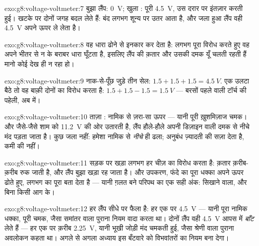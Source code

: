 \begin{solution}{exo:g8:voltage-voltmeter:7}
बुझा लैंप: \qty{0}{V}; खुला : पूरी \qty{4.5}{V}, उस दरार पर
इंतज़ार करती हुई। खटके पर दोनों जगह बदल लेते हैं: बंद  लगभग शून्य
पर उतर आता है, और जला हुआ लैंप वही \qty{4.5}{V} अपने ऊपर ले लेता है।
\end{solution}

\begin{solution}{exo:g8:voltage-voltmeter:8}
वह धारा ढोने से इनकार कर देता है: लगभग पूरा विरोध करते हुए वह अपने
भीतर से न के बराबर धारा घूँटता है, इसलिए लैंप की क़तार और उसकी दमक
यूँ चलती रहती हैं मानो कोई देख ही न रहा हो।
\end{solution}

\begin{solution}{exo:g8:voltage-voltmeter:9}
नाक-से-पूँछ जुड़े तीन सेल: $1.5 + 1.5 + 1.5 = \qty{4.5}{V}$. एक उलटा
बैठे तो वह बाक़ी दोनों का विरोध करता है: $1.5 + 1.5 - 1.5 =
\qty{1.5}{V}$ --- बरसों पहले वाली टॉर्च की पहेली, अब  में।
\end{solution}

\begin{solution}{exo:g8:voltage-voltmeter:10}
ताज़ा : नामिक से ज़रा-सा ऊपर --- यानी पूरी ख़ुशमिज़ाज चमक। और
जैसे-जैसे शाम  को \qty{11.2}{V} की ओर उतारती है, लैंप हौले-हौले
अपनी डिज़ाइन वाली दमक से नीचे मंद पड़ता जाता है। कुछ जला नहीं:
 हमेशा नामिक से \emph{नीचे} ही ढला; अनुबंध ज़्यादती की सज़ा
देता है, कमी की नहीं।
\end{solution}

\begin{solution}{exo:g8:voltage-voltmeter:11}
सड़क पर खड़ा  लगभग हर चीज़ का विरोध करता है: क़तार क़रीब-क़रीब
रुक जाती है, और लैंप बुझा खड़ा रह जाता है। और उपकरण, फंदे का पूरा
धक्का अपने ऊपर ढोते हुए, लगभग  का पूरा  बता देता है ---
यानी ग़लत बने परिपथ का एक सही अंक: सिखाने वाला, और बिना किसी आग के।
\end{solution}

\begin{solution}{exo:g8:voltage-voltmeter:12}
 हर लैंप सीधे  पर फैला है: हर एक पर \qty{4.5}{V} ---
यानी पूरा नामिक धक्का, पूरी चमक, जैसा समांतर वाला पुराना नियम वादा
करता था।  दोनों लैंप वही \qty{4.5}{V} आपस में \emph{बाँट}
लेते हैं --- हर एक पर क़रीब \qty{2.25}{V}, यानी भूखी जोड़ी मंद चमकती
हुई, जैसा श्रेणी वाला पुराना अवलोकन कहता था। अगले से अगला अध्याय इस
बँटवारे को विभवांतरों का नियम बना देगा।
\end{solution}

